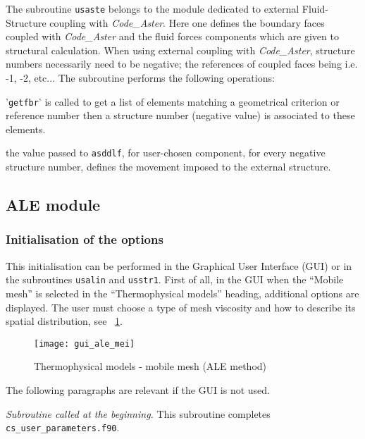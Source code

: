 {{The subroutine \texttt{usaste} belongs to the module dedicated to external
 Fluid-Structure coupling with \textit{Code\_Aster}. Here one defines the boundary
 faces coupled with \textit{Code\_Aster} and the fluid forces components which are
 given to structural calculation. When using external coupling with \textit{Code\_Aster},
 structure numbers necessarily need to be negative; the references of coupled faces being
 i.e. -1, -2, etc...
The subroutine performs the following operations:
\begin{list}{-}{}
 \item '\texttt{getfbr}' is called to get a list of elements matching a 
geometrical criterion or reference number then a structure number (negative value) is associated
 to these elements.
 \item the value passed to \texttt{asddlf}, for user-chosen component, for every negative
 structure number, defines the movement imposed to the external structure.
\end{list}

\subsection{ALE module}
\subsubsection{Initialisation of the options}
\label{prg_usalin}%
This initialisation can be performed in the Graphical User Interface (GUI)
 or in the subroutines \texttt{usalin} and \texttt{usstr1}. First of all,
 in the GUI when the ``Mobile mesh'' is selected in the ``Thermophysical models''
 heading, additional options are displayed. The user must choose a type of mesh
 viscosity and how to describe its spatial distribution, see \figurename~\ref{fig:Ini-ale}.

\begin{figure}[ht]
\begin{center}
\texttt{[image: gui\_ale\_mei]}
\caption{Thermophysical models - mobile mesh (ALE method)}
\label{fig:Ini-ale}
\end{center}
\end{figure}

The following paragraphs are relevant if the GUI is not used.

\noindent
\textit{Subroutine called at the beginning.}
This subroutine completes \texttt{cs\_user\_parameters.f90}.

}}
